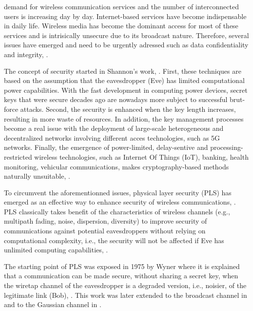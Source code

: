\documentclass[journal,comsoc]{IEEEtran}
\begin{document}
 demand for wireless communication services and the number of interconnected users is increasing day by day. Internet-based services have become indispensable in daily life. Wireless media has become the dominant access for most of these services and is intrisically unsecure due to its broadcast nature. Therefore, several issues have emerged and need to be urgently adressed such as data confidentiality and integrity, \cite{8509094,8543573}.

The concept of security started in Shannon's work, \cite{6769090}. First, these techniques are based on the assumption that the eavesdropper (Eve) has limited computational power capabilities. With the fast development in computing power devices, secret keys that were secure decades ago are nowadays more subject to successful brut-force attacks. Second, the security is enhanced when the key length increases, resulting in more waste of resources. In addition, the key management processes become a real issue with the deployment of large-scale heterogeneous and decentralized networks involving different acces technologies, such as 5G networks. Finally, the emergence of power-limited, delay-sentive and processing-restricted wireless technologies, such as Internet Of Things (IoT), banking, health monitoring, vehicular communications, makes cryptography-based methods naturally unsuitable, \cite{8509094}.

To circumvent the aforementionned issues, physical layer security (PLS) has emerged as an effective way to enhance security of wireless communications, \cite{alves2012performance,yang2012physical,tran2015secrecy,8353879}. PLS classically takes benefit of the characteristics of wireless channels (e.g., multipath fading, noise, dispersion, diversity) to improve security of communications against potential eavesdroppers without relying on computational complexity, i.e., the security will not be affected if Eve has unlimited computing capabilities, \cite{9049811,snchez2020survey}. 

The starting point of PLS was exposed in 1975 by Wyner where it is explained that a communication can be made secure, without sharing a secret key, when the wiretap channel of the eavesdropper is a degraded version, i.e., noisier, of the legitimate link (Bob), \cite{6772207}. This work was later extended to the broadcast channel in \cite{1055892} and to the Gaussian channel in \cite{1055917}. 
\end{document}
